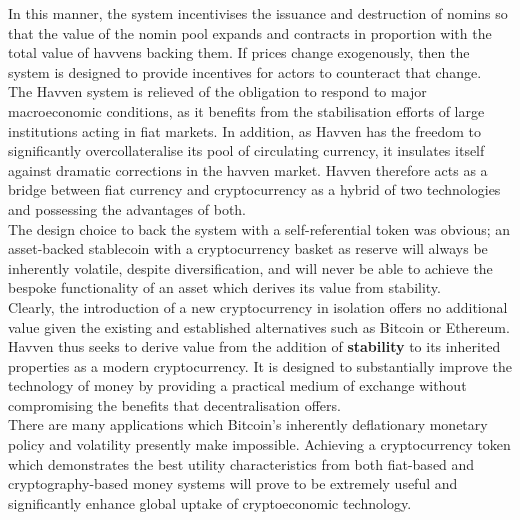 \noindent In this manner, the system incentivises the issuance and destruction of nomins so that the value of
the nomin pool expands and contracts in proportion with the total value of havvens backing them.
If prices change exogenously, then the system is designed to provide incentives for actors to
counteract that change. \\

\noindent The Havven system is relieved of the obligation to respond to major macroeconomic conditions, 
as it benefits from the stabilisation efforts of large institutions acting in fiat markets.
In addition, as Havven has the freedom to significantly overcollateralise its pool of circulating currency, it
insulates itself against dramatic corrections in the havven market.
Havven therefore acts as a bridge between fiat currency and cryptocurrency as a hybrid of two technologies and possessing
the advantages of both. \\

\noindent The design choice to back the system with a self-referential token was obvious; an asset-backed stablecoin with a cryptocurrency basket as reserve will always be inherently volatile, despite diversification, and will never be able to achieve the bespoke functionality of an asset which derives its value from stability. \\

\noindent Clearly, the introduction of a new cryptocurrency in isolation offers no additional value given
the existing and established alternatives such as Bitcoin or Ethereum. Havven thus seeks to derive value
from the addition of \textbf{stability} to its inherited properties as a modern cryptocurrency.
It is designed to substantially improve the technology of money by providing a practical medium of exchange without compromising the benefits that
decentralisation offers. \\

\noindent There are many applications which Bitcoin's inherently deflationary monetary policy and volatility presently make impossible. Achieving a cryptocurrency token which demonstrates the best utility characteristics from both fiat-based and cryptography-based money systems will prove to be extremely useful and significantly enhance global uptake of cryptoeconomic technology.


\pagebreak
